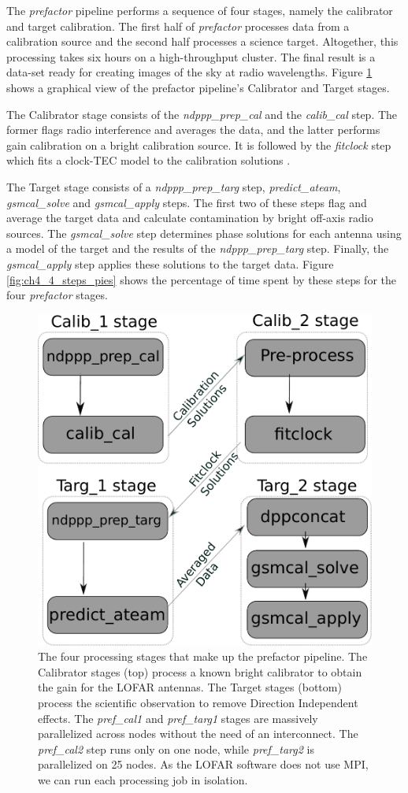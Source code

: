 The \textit{prefactor} pipeline performs a sequence of four stages, namely the calibrator and target calibration. The first half of \textit{prefactor} processes data from a calibration source and the second half processes a science target. Altogether, this processing takes six hours on a high-throughput cluster. The final result is a data-set ready for creating  images of the sky at radio wavelengths. Figure \ref{fig:ch4_four_steps_box} shows a graphical view of the prefactor pipeline's Calibrator and Target stages.


The Calibrator stage consists of the \textit{ndppp\_prep\_cal} and the \textit{calib\_cal} step. The former flags radio interference and averages the data, and the latter performs gain calibration on a bright calibration source. It is followed by the \textit{fitclock} step which fits a clock-TEC model to the calibration solutions \citep{lofar_prefactor}.  

The Target stage consists of a \textit{ndppp\_prep\_targ} step, \textit{predict\_ateam}, \textit{gsmcal\_solve} and \textit{gsmcal\_apply} steps. The first two of these steps flag and average the target data and calculate contamination by bright off-axis radio sources. The \textit{gsmcal\_solve} step determines phase solutions for each antenna using a model of the target and the results of the \textit{ndppp\_prep\_targ} step. Finally, the \textit{gsmcal\_apply} step applies these solutions to the target data. Figure \ref{fig:ch4_4_steps_pies} shows the percentage of time spent by these steps for the four \textit{prefactor} stages.

\begin{figure}[H]
    \centering
    \includegraphics[width=0.5\linewidth]{ch4/figures/fig1/fig1.pdf}
      \caption[The four processing stages that make up the prefactor pipeline.]{The four processing stages that make up the prefactor pipeline. The Calibrator stages (top) process a known bright calibrator to obtain the gain for the LOFAR antennas. The Target stages (bottom) process the scientific observation to remove Direction Independent effects. The \textit{pref\_cal1} and \textit{pref\_targ1} stages are massively parallelized across nodes without the need of an interconnect. The \textit{pref\_cal2} step runs only on one node, while \textit{pref\_targ2} is parallelized on 25 nodes. As the LOFAR software does not use MPI, we can run each processing job in isolation. }
	\label{fig:ch4_four_steps_box}
\end{figure}

